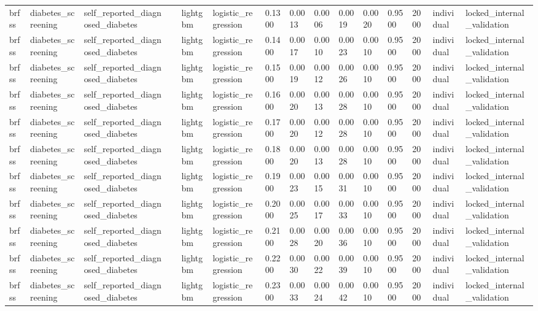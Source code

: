 \begin{tabular}{lllllllllllllll}
brfss & diabetes\_screening & self\_reported\_diagnosed\_diabetes &  & lightgbm & logistic\_regression & 0.1300 & 0.0013 & 0.0006 & 0.0019 & 0.0020 & 0.9500 & 2000 & individual & locked\_internal\_validation \\
brfss & diabetes\_screening & self\_reported\_diagnosed\_diabetes &  & lightgbm & logistic\_regression & 0.1400 & 0.0017 & 0.0010 & 0.0023 & 0.0010 & 0.9500 & 2000 & individual & locked\_internal\_validation \\
brfss & diabetes\_screening & self\_reported\_diagnosed\_diabetes &  & lightgbm & logistic\_regression & 0.1500 & 0.0019 & 0.0012 & 0.0026 & 0.0010 & 0.9500 & 2000 & individual & locked\_internal\_validation \\
brfss & diabetes\_screening & self\_reported\_diagnosed\_diabetes &  & lightgbm & logistic\_regression & 0.1600 & 0.0020 & 0.0013 & 0.0028 & 0.0010 & 0.9500 & 2000 & individual & locked\_internal\_validation \\
brfss & diabetes\_screening & self\_reported\_diagnosed\_diabetes &  & lightgbm & logistic\_regression & 0.1700 & 0.0020 & 0.0012 & 0.0028 & 0.0010 & 0.9500 & 2000 & individual & locked\_internal\_validation \\
brfss & diabetes\_screening & self\_reported\_diagnosed\_diabetes &  & lightgbm & logistic\_regression & 0.1800 & 0.0020 & 0.0013 & 0.0028 & 0.0010 & 0.9500 & 2000 & individual & locked\_internal\_validation \\
brfss & diabetes\_screening & self\_reported\_diagnosed\_diabetes &  & lightgbm & logistic\_regression & 0.1900 & 0.0023 & 0.0015 & 0.0031 & 0.0010 & 0.9500 & 2000 & individual & locked\_internal\_validation \\
brfss & diabetes\_screening & self\_reported\_diagnosed\_diabetes &  & lightgbm & logistic\_regression & 0.2000 & 0.0025 & 0.0017 & 0.0033 & 0.0010 & 0.9500 & 2000 & individual & locked\_internal\_validation \\
brfss & diabetes\_screening & self\_reported\_diagnosed\_diabetes &  & lightgbm & logistic\_regression & 0.2100 & 0.0028 & 0.0020 & 0.0036 & 0.0010 & 0.9500 & 2000 & individual & locked\_internal\_validation \\
brfss & diabetes\_screening & self\_reported\_diagnosed\_diabetes &  & lightgbm & logistic\_regression & 0.2200 & 0.0030 & 0.0022 & 0.0039 & 0.0010 & 0.9500 & 2000 & individual & locked\_internal\_validation \\
brfss & diabetes\_screening & self\_reported\_diagnosed\_diabetes &  & lightgbm & logistic\_regression & 0.2300 & 0.0033 & 0.0024 & 0.0042 & 0.0010 & 0.9500 & 2000 & individual & locked\_internal\_validation \\

\end{tabular}
